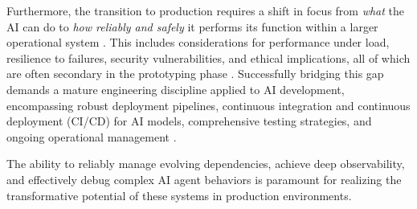 Furthermore, the transition to production requires a shift in focus from \textit{what} the AI can do to \textit{how reliably and safely} it performs its function within a larger operational system \cite{Reger2026}. This includes considerations for performance under load, resilience to failures, security vulnerabilities, and ethical implications, all of which are often secondary in the prototyping phase \cite{Gartner2025}. Successfully bridging this gap demands a mature engineering discipline applied to AI development, encompassing robust deployment pipelines, continuous integration and continuous deployment (CI/CD) for AI models, comprehensive testing strategies, and ongoing operational management \cite{Reger2026}.

The ability to reliably manage evolving dependencies, achieve deep observability, and effectively debug complex AI agent behaviors is paramount for realizing the transformative potential of these systems in production environments.
